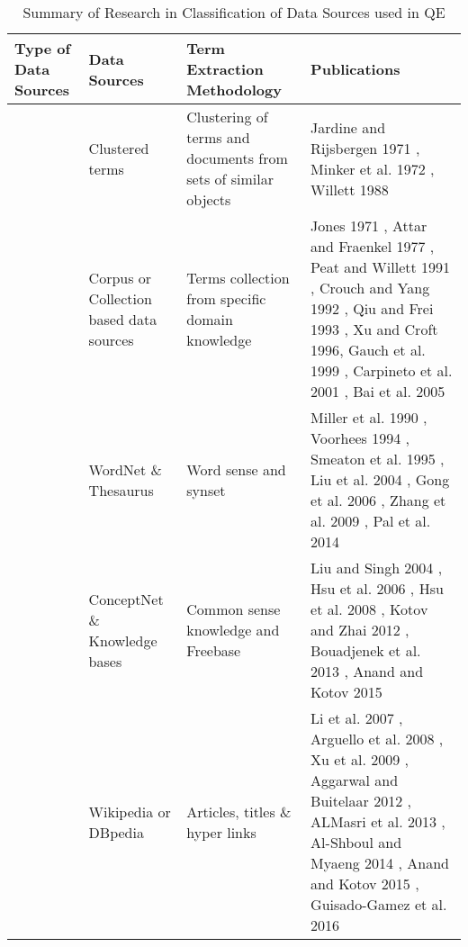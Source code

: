 \begin{table}[!h]
	\centering
	\caption{Summary of Research in Classification of Data Sources used in QE \label{tab:3}}{
		
		\begin{tabular}{ | M{2.2cm} | M{2.2cm} | M{3.3cm} | M{4.5cm} | }
			\hline 
			
			\textbf{Type of Data Sources} & \textbf{Data Sources} & \textbf{Term Extraction Methodology} & \textbf{Publications} \\ \hline 
			 & Clustered terms & Clustering of terms and documents from sets of similar objects & Jardine and Rijsbergen 1971 \cite{jardine1971use}, Minker et al. 1972 \cite{minker1972evaluation}, Willett 1988 \cite{willett1988recent}   \\  & Corpus or Collection based data sources & Terms collection from specific domain knowledge & Jones 1971 \cite{jones1971automatic}, Attar and Fraenkel 1977 \cite{attar1977local}, Peat and Willett 1991 \cite{peat1991limitations}, Crouch and Yang 1992 \cite{crouch1992experiments}, Qiu and Frei 1993 \cite{qiu1993concept}, Xu and Croft 1996\cite{xu1996query}, Gauch et al.
			1999 \cite{gauch1999corpus}, Carpineto et al. 2001 \cite{carpineto2001information}, Bai et al. 2005 \cite{bai2005query}  \\ \hline
			 & WordNet \& Thesaurus & Word sense and synset & Miller et al. 1990 \cite{miller1990introduction}, Voorhees
			1994 \cite{voorhees1994query}, Smeaton et al. 1995 \cite{smeaton1995trec}, Liu et al. 2004 \cite{liu2004effective}, Gong et al. 2006 \cite{gong2006multi}, Zhang et al. 2009 \cite{zhang2009concept}, Pal et al. 2014 \cite{pal2014improving}   \\  & ConceptNet \& Knowledge bases & Common sense
			knowledge and Freebase & Liu and Singh 2004 \cite{liu2004conceptnet}, Hsu
			et al. 2006 \cite{hsu2006query}, Hsu et al. 2008 \cite{hsu2008combining}, Kotov and Zhai 2012 \cite{kotov2012tapping}, Bouadjenek et al. 2013 \cite{bouadjenek2013sopra}, Anand and Kotov 2015 \cite{anand2015empirical} \\  & Wikipedia or DBpedia & Articles, titles \& hyper links & Li et al. 2007 \cite{li2007improving}, Arguello et al. 2008 \cite{arguello2008document}, Xu et al. 2009 \cite{xu2009query}, Aggarwal and Buitelaar 2012 \cite{aggarwal2012query}, ALMasri et al. 2013 \cite{almasri2013wikipedia}, Al-Shboul and Myaeng 2014 \cite{al2014wikipedia}, Anand and Kotov 2015 \cite{anand2015empirical}, Guisado-Gamez et al. 2016 \cite{guisado2016query} 

\end{tabular}}
\end{table}
